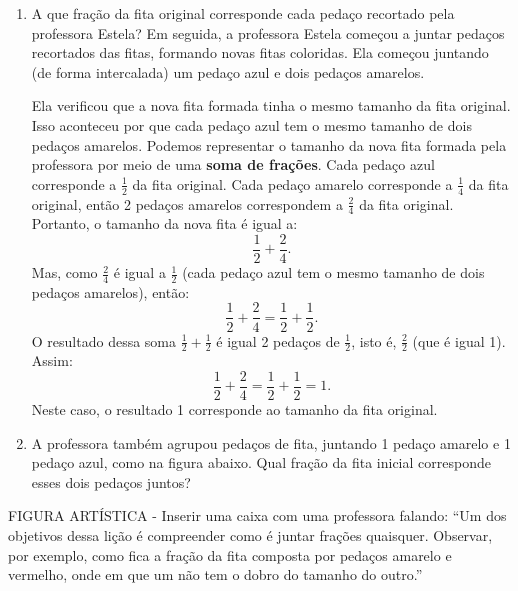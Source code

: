 \begin{enumerate} [\quad a)] %
  \item     A que fração da fita original corresponde cada pedaço recortado pela professora Estela?    \mbox{} \newline           \mbox{} \newline      Em seguida, a professora Estela começou a juntar pedaços recortados das fitas, formando novas fitas coloridas. Ela começou juntando (de forma intercalada) um pedaço azul e dois pedaços amarelos.     \mbox{} \newline      

\begin{center}
\end{center}

Ela verificou que a nova fita formada tinha o mesmo tamanho da fita original. Isso aconteceu por que cada pedaço azul tem o mesmo tamanho de dois pedaços amarelos. Podemos representar o tamanho da nova fita formada pela professora por meio de uma {\bf soma de frações}. Cada pedaço azul corresponde a $\frac{1}{2}$ da fita original. Cada pedaço amarelo corresponde a $\frac{1}{4}$ da fita original, então 2 pedaços amarelos correspondem a $\frac{2}{4}$ da fita original. Portanto, o tamanho da nova fita é igual a: $$\dfrac{1}{2} + \dfrac{2}{4}.$$ Mas, como $\frac{2}{4}$ é igual a $\frac{1}{2}$ (cada pedaço azul tem o mesmo tamanho de dois pedaços amarelos), então: $$\dfrac{1}{2} + \dfrac{2}{4} = \dfrac{1}{2} + \dfrac{1}{2}.$$ O resultado dessa soma $\frac{1}{2} + \frac{1}{2}$ é igual 2 pedaços de $\frac{1}{2}$, isto é, $\frac{2}{2}$ (que é igual 1). Assim: $$\dfrac{1}{2} + \dfrac{2}{4} = \dfrac{1}{2} + \dfrac{1}{2} = 1.$$ Neste caso, o resultado 1 corresponde ao tamanho da fita original.
  \item     A professora também agrupou pedaços de fita, juntando 1 pedaço amarelo e 1 pedaço azul, como na figura abaixo. Qual fração da fita inicial corresponde esses dois pedaços juntos?
\end{enumerate} %

   
\begin{imagem*}[breakable]{}{}   FIGURA ARTÍSTICA - Inserir uma caixa com uma professora falando:   ``Um dos objetivos dessa lição é compreender como é juntar frações quaisquer. Observar, por exemplo, como fica a fração da fita composta por pedaços amarelo e vermelho, onde em que um não tem o dobro do tamanho do outro.''\end{imagem*}

